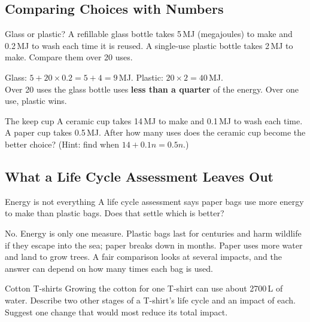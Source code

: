 \label{theory:2}

\subsection{Comparing Choices with Numbers}\label{sub:a2.1}

\begin{workedex}{Glass or plastic?}
A refillable glass bottle takes 5\,MJ (megajoules) to make and 0.2\,MJ to wash each time it is reused. A single-use plastic bottle takes 2\,MJ to make. Compare them over 20 uses.

\smallskip
Glass: $5 + 20 \times 0.2 = 5 + 4 = 9$\,MJ. \quad Plastic: $20 \times 2 = 40$\,MJ.\\
Over 20 uses the glass bottle uses \textbf{less than a quarter} of the energy. Over one use, plastic wins.
\end{workedex}

\begin{wedo}{The keep cup}
A ceramic cup takes 14\,MJ to make and 0.1\,MJ to wash each time. A paper cup takes 0.5\,MJ. After how many uses does the ceramic cup become the better choice? (Hint: find when $14 + 0.1n = 0.5n$.)
\workbox{5cm}
\end{wedo}

\subsection{What a Life Cycle Assessment Leaves Out}\label{sub:a2.2}

\begin{workedex}{Energy is not everything}
A life cycle assessment says paper bags use more energy to make than plastic bags. Does that settle which is better?

\smallskip
No. Energy is only one measure. Plastic bags last for centuries and harm wildlife if they escape into the sea; paper breaks down in months. Paper uses more water and land to grow trees. A fair comparison looks at several impacts, and the answer can depend on how many times each bag is used.
\end{workedex}

\begin{wedo}{Cotton T-shirts}
Growing the cotton for one T-shirt can use about 2700\,L of water. Describe two other stages of a T-shirt's life cycle and an impact of each. Suggest one change that would most reduce its total impact.
\answerbox{5cm}
\end{wedo}

